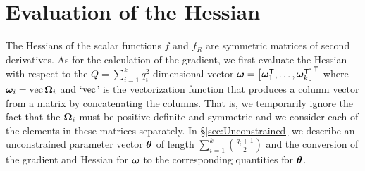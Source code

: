 \documentclass[12pt]{article}
\begin{document}
\section{Evaluation of the Hessian}
\label{sec:Hessian}

The Hessians of the scalar functions $f$ and $f_R$ are symmetric
matrices of second derivatives.  As for the calculation of the
gradient, we first evaluate the Hessian with respect to the
$Q=\sum_{i=1}^k q_i^2$ dimensional vector
$\bm{\omega}=\left[\bm{\omega}_1^\mathsf{T},\dots,\bm{\omega}_k^\mathsf{T}\right]^\mathsf{T}$
where $\bm{\omega}_i=\operatorname{\mathrm{vec}}\bm{\Omega}_i$ and `$\operatorname{\mathrm{vec}}$' is the vectorization
function that produces a column vector from a matrix by concatenating
the columns.  That is, we temporarily ignore the fact that the
$\bm{\Omega}_i$ must be positive definite and symmetric and we consider each of the
elements in these matrices separately.  In \S\ref{sec:Unconstrained}
we describe an unconstrained parameter vector $\bm{\theta}$ of length
$\sum_{i=1}^k\binom{q_i+1}{2}$ and the conversion of the gradient and
Hessian for $\bm{\omega}$ to the corresponding quantities for $\bm{\theta}$.
\end{document}
